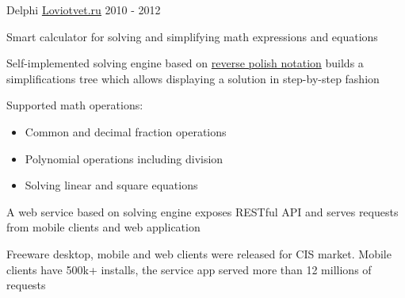 

\begin{cventries}

  \cventry
    {Delphi}
    {\color{awesome-skyblue}\href{http://loviotvet.ru}{\underline{Loviotvet.ru}}}
    {}
    {2010 - 2012}
    {
      \begin{cvitems} %
      	\item Smart calculator for solving and simplifying math expressions and equations
        \item Self-implemented solving engine based on {\color{awesome-skyblue}\href{https://en.wikipedia.org/wiki/Reverse_Polish_notation}{reverse polish notation}} builds a simplifications tree which allows displaying a solution in step-by-step fashion
        \item Supported math operations:
          \begin{itemize}
              \item Common and decimal fraction operations
              \item Polynomial operations including division
              \item Solving linear and square equations
          \end{itemize}
        \item A web service based on solving engine exposes RESTful API and serves requests from mobile clients and web application
        \item Freeware desktop, mobile and web clients were released for CIS market. Mobile clients have 500k+ installs, the service app served more than 12 millions of requests
      \end{cvitems}
    }


\end{cventries}
